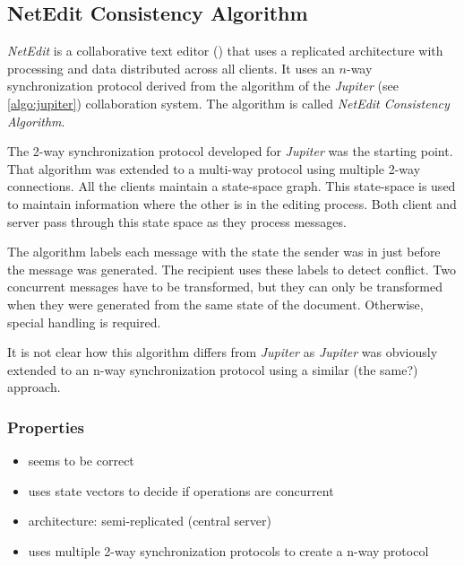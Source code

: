 \subsection{NetEdit Consistency Algorithm}
\label{algo:netedit}

\emph{NetEdit} is a collaborative text editor (\cite{netedit}) that uses a replicated architecture with processing and data distributed across all clients. It uses an $n$-way synchronization protocol derived from the algorithm of the \emph{Jupiter} (see \ref{algo:jupiter}) collaboration system. The algorithm is called \emph{NetEdit Consistency Algorithm}.

The 2-way synchronization protocol developed for \emph{Jupiter} was the starting point. That algorithm was extended to a multi-way protocol using multiple 2-way connections. All the clients maintain a state-space graph. This state-space is used to maintain information where the other is in the editing process. Both client and server pass through this state space as they process messages.

The algorithm labels each message with the state the sender was in just before the message was generated. The recipient uses these labels to detect conflict. Two concurrent messages have to be transformed, but they can only be transformed  when they were generated from the same state of the document. Otherwise, special handling is required.

It is not clear how this algorithm differs from \emph{Jupiter} as \emph{Jupiter} was obviously extended to an n-way synchronization protocol using a similar (the same?) approach.


\subsubsection{Properties}
\begin{itemize}
 \item seems to be correct
 \item uses state vectors to decide if operations are concurrent
 \item architecture: semi-replicated (central server)
 \item uses multiple 2-way synchronization protocols to create a n-way protocol
\end{itemize}


